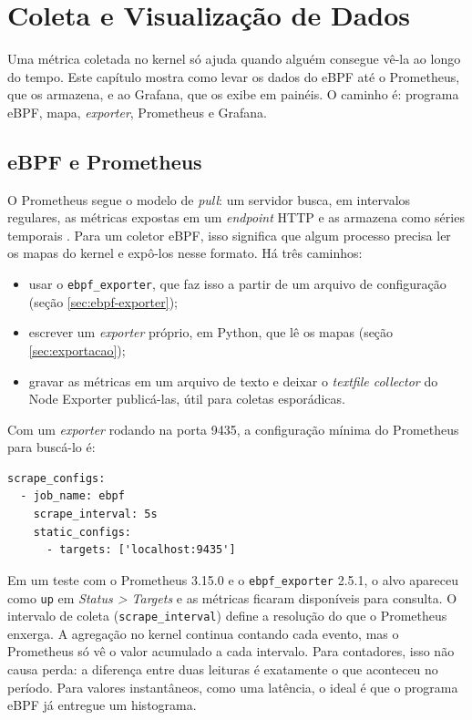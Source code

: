 \chapter{Coleta e Visualização de Dados}\label{cap:coleta}

Uma métrica coletada no kernel só ajuda quando alguém consegue vê-la ao longo do tempo. Este capítulo mostra como levar os dados do eBPF até o Prometheus, que os armazena, e ao Grafana, que os exibe em painéis. O caminho é: programa eBPF, mapa, \textit{exporter}, Prometheus e Grafana.

\section{eBPF e Prometheus}

O Prometheus segue o modelo de \textit{pull}: um servidor busca, em intervalos regulares, as métricas expostas em um \textit{endpoint} HTTP e as armazena como séries temporais \cite{prometheusdocs,turnbull2018}. Para um coletor eBPF, isso significa que algum processo precisa ler os mapas do kernel e expô-los nesse formato. Há três caminhos:

\begin{itemize}
  \item usar o \texttt{ebpf\_exporter}, que faz isso a partir de um arquivo de configuração (seção \ref{sec:ebpf-exporter});
  \item escrever um \textit{exporter} próprio, em Python, que lê os mapas (seção \ref{sec:exportacao});
  \item gravar as métricas em um arquivo de texto e deixar o \textit{textfile collector} do Node Exporter publicá-las, útil para coletas esporádicas.
\end{itemize}

Com um \textit{exporter} rodando na porta 9435, a configuração mínima do Prometheus para buscá-lo é:

\begin{lstlisting}
scrape_configs:
  - job_name: ebpf
    scrape_interval: 5s
    static_configs:
      - targets: ['localhost:9435']
\end{lstlisting}

Em um teste com o Prometheus 3.15.0 e o \texttt{ebpf\_exporter} 2.5.1, o alvo apareceu como \texttt{up} em \textit{Status > Targets} e as métricas ficaram disponíveis para consulta. O intervalo de coleta (\texttt{scrape\_interval}) define a resolução do que o Prometheus enxerga. A agregação no kernel continua contando cada evento, mas o Prometheus só vê o valor acumulado a cada intervalo. Para contadores, isso não causa perda: a diferença entre duas leituras é exatamente o que aconteceu no período. Para valores instantâneos, como uma latência, o ideal é que o programa eBPF já entregue um histograma.

